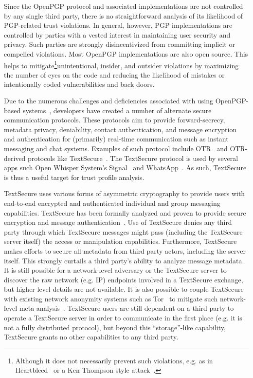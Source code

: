 Since the OpenPGP protocol and associated implementations are not
controlled by any single third party, there is no straightforward
analysis of its likelihood of PGP-related trust violations. In
general, however, PGP implementations are controlled by parties with a
vested interest in maintaining user security and privacy. Such parties
are strongly disincentivized from committing implicit or compelled
violations. Most OpenPGP implementations are also open source. This
helps to mitigate\footnote{Although it does not necessarily prevent
  such violations, e.g. as in Heartbleed~\cite{heartbleed} or a Ken
  Thompson style attack~\cite{thompson1984}.}unintentional, insider,
and outsider violations by maximizing the number of eyes on the code
and reducing the likelihood of mistakes or intentionally coded
vulnerabilities and back doors.

Due to the numerous challenges and deficiencies associated with using
OpenPGP-based systems~\cite{green-pgp}, developers have created a
number of alternate secure communication protocols. These protocols
aim to provide forward-secrecy, metadata privacy, deniability, contact
authentication, and message encryption and authentication for
(primarily) real-time communication such as instant messaging and chat
systems. Examples of such protocol include OTR~\cite{otr-v3} and
OTR-derived protocols like TextSecure~\cite{otr-advanced-ratchet}. The
TextSecure protocol is used by several apps such Open Whisper System's
Signal~\cite{openwhisper} and WhatsApp~\cite{whatsapp}. As such,
TextSecure is thus a useful target for trust profile analysis.

TextSecure uses various forms of asymmetric cryptography to provide
users with end-to-end encrypted and authenticated individual and group
messaging capabilities. TextSecure has been formally analyzed and
proven to provide secure encryption and message
authentication~\cite{frosch2014}. Use of TextSecure denies any third
party through which TextSecure messages might pass (including the
TextSecure server itself) the access or manipulation
capabilities. Furthermore, TextSecure makes efforts to secure all
metadata from third party actors, including the server itself. This
strongly curtails a third party's ability to analyze message
metadata. It is still possible for a network-level adversary or the
TextSecure server to discover the raw network (e.g. IP) endpoints
involved in a TextSecure exchange, but higher level details are not
available. It is also possible to couple TextSecure with existing
network anonymity systems such as Tor~\cite{dingledine2004} to
mitigate such network-level
meta-analysis~\cite{intercept-chatting}. TextSecure users are still
dependent on a third party to operate a TextSecure server in order to
communicate in the first place (e.g. it is not a fully distributed
protocol), but beyond this ``storage''-like capability, TextSecure
grants no other capabilities to any third party.

